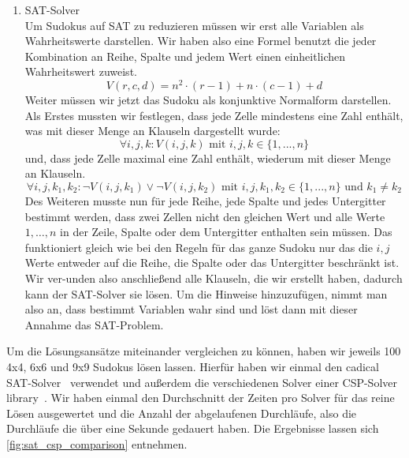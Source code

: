 \begin{enumerate}
    \item SAT-Solver \\
    Um Sudokus auf SAT zu reduzieren müssen wir erst alle Variablen als Wahrheitswerte darstellen.
    Wir haben also eine Formel benutzt die jeder Kombination an Reihe,
    Spalte und jedem Wert einen einheitlichen Wahrheitswert zuweist.
    \begin{equation}
        V(r, c, d) = n^2 \cdot (r - 1) + n \cdot (c - 1) + d
    \end{equation}
    Weiter müssen wir jetzt das Sudoku als konjunktive Normalform darstellen.
    Als Erstes mussten wir festlegen, dass jede Zelle mindestens eine Zahl enthält, was mit dieser Menge an Klauseln dargestellt wurde:
    \begin{equation}
        \forall i, j, k: V(i, j, k) \text{ mit } i, j, k \in \{1, ..., n\} %
    \end{equation}
    und, dass jede Zelle maximal eine Zahl enthält, wiederum mit dieser Menge an Klauseln.
    \begin{equation}
        \forall i, j, k_1, k_2: \neg V(i, j, k_1) \vee \neg V(i, j, k_2) \text{ mit }i, j, k_1, k_2 \in \{1, ..., n\} \text{ und } k_1 \neq k_2
    \end{equation}
    Des Weiteren musste nun für jede Reihe, jede Spalte und jedes Untergitter bestimmt werden, dass zwei Zellen nicht den gleichen Wert und alle Werte $1, \dots, n$
    in der Zeile, Spalte oder dem Untergitter enthalten sein müssen.
    Das funktioniert gleich wie bei den Regeln für das ganze Sudoku nur das die $i, j$ Werte entweder auf die Reihe, die Spalte oder das Untergitter beschränkt ist.
    Wir ver-unden also anschließend alle Klauseln, die wir erstellt haben, dadurch kann der SAT-Solver sie lösen.
    Um die Hinweise hinzuzufügen, nimmt man also an, dass bestimmt Variablen wahr sind und löst dann mit dieser Annahme das SAT-Problem.
\end{enumerate}

Um die Lösungsansätze miteinander vergleichen zu können, haben wir jeweils 100 4x4, 6x6 und 9x9 Sudokus lösen lassen.
Hierfür haben wir einmal den cadical SAT-Solver~\cite{pysat} verwendet und außerdem die verschiedenen Solver einer CSP-Solver library~\cite{pycsp}.
Wir haben einmal den Durchschnitt der Zeiten pro Solver für das reine Lösen ausgewertet und die Anzahl der abgelaufenen Durchläufe, also die Durchläufe die über eine Sekunde gedauert haben.
Die Ergebnisse lassen sich \cref{fig:sat_csp_comparison} entnehmen.

